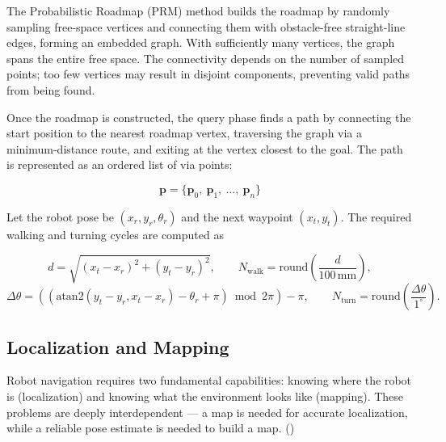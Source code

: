 \documentclass[a4paper,12pt]{article}
\begin{document}
The Probabilistic Roadmap (PRM) method builds the roadmap by randomly sampling
free-space vertices and connecting them with obstacle-free straight-line edges,
forming an embedded graph. With sufficiently many vertices, the graph spans the
entire free space. The connectivity depends on the number of sampled points;
too few vertices may result in disjoint components, preventing valid paths from
being found.

Once the roadmap is constructed, the query phase finds a path by connecting the
start position to the nearest roadmap vertex, traversing the graph via a
minimum-distance route, and exiting at the vertex closest to the goal. The
path is represented as an ordered list of via points:

\begin{equation}
    \mathbf{p} = \{\mathbf{p}_0,\ \mathbf{p}_1,\ \dots,\ \mathbf{p}_n\}
\end{equation}

Let the robot pose be $(x_r, y_r, \theta_r)$ and the next waypoint
$(x_t, y_t)$. The required walking and turning cycles are computed as

\begin{equation}
d = \sqrt{(x_t - x_r)^2 + (y_t - y_r)^2},
\qquad
N_{\text{walk}} = \mathrm{round}\!\left(\frac{d}{100\,\text{mm}}\right),
\end{equation}
\begin{equation}
\Delta\theta =
\left((\mathrm{atan2}(y_t - y_r, x_t - x_r) - \theta_r + \pi)
\bmod 2\pi\right) - \pi,
\qquad
N_{\text{turn}} =
\mathrm{round}\!\left(\frac{\Delta\theta}{1^\circ}\right).
\end{equation}

\subsection{Localization and Mapping}

Robot navigation requires two fundamental capabilities: knowing where the robot
is (localization) and knowing what the environment looks like (mapping). These
problems are deeply interdependent --- a map is needed for accurate
localization, while a reliable pose estimate is needed to build a map.
(\cite{Corke2023})
\end{document}
